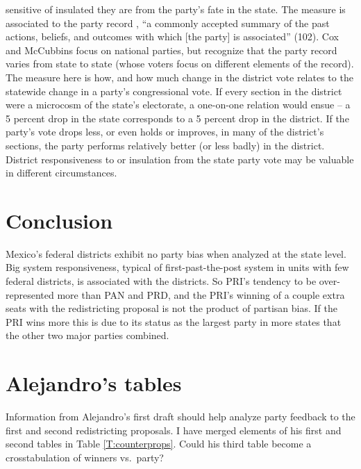 \documentclass[letter,12pt]{article}
\begin{document}
sensitive of insulated they are from the party's fate in the state. The measure is associated to the party record \citep{cox.mccubbins.1993}, ``a commonly accepted summary of the past actions, beliefs, and outcomes with which [the party] is associated'' (102). Cox and McCubbins focus on national parties, but recognize that the party record varies from state to state (whose voters focus on different elements of the record). The measure here is how, and how much change in the district vote relates to the statewide change in a party's congressional vote. If every section in the district were a microcosm of the state's electorate, a one-on-one relation would ensue -- a 5 percent drop in the state corresponds to a 5 percent drop in the district. If the party's vote drops less, or even holds or improves, in many of the district's sections, the party performs relatively better (or less badly) in the district. District responsiveness to or insulation from the state party vote may be valuable in different circumstances. 


\section{Conclusion}

Mexico's federal districts exhibit no party bias when analyzed at the state level. Big system responsiveness, typical of first-past-the-post system in units with few federal districts, is associated with the districts. So PRI's tendency to be over-represented more than PAN and PRD, and the PRI's winning of a couple extra seats with the redistricting proposal is not the product of partisan bias. If the PRI wins more this is due to its status as the largest party in more states that the other two major parties combined. 

\section{Alejandro's tables}

Information from Alejandro's first draft should help analyze party feedback to the first and second redistricting proposals. I have merged elements of his first and second tables in Table \ref{T:counterprops}. Could his third table become a crosstabulation of winners vs.\ party?
\end{document}

